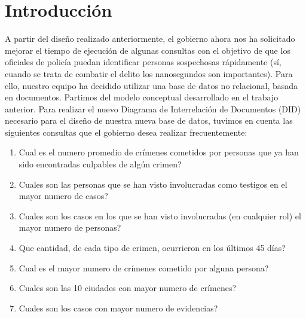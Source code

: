 \documentclass{article}
\theoremstyle{definition}
\theoremstyle{remark}
\begin{document}
{} %

\grupo{}

 
\maketitle

\tableofcontents

\pagebreak

\section{Introducción}

A partir del diseño realizado anteriormente, el gobierno ahora nos ha solicitado mejorar el tiempo de ejecución de algunas consultas con el objetivo de que los oficiales de policía puedan identificar personas sospechosas rápidamente (sí, cuando se trata de combatir el delito los nanosegundos son importantes). Para ello, nuestro equipo ha decidido utilizar una base de datos no relacional, basada en documentos. Partimos del modelo conceptual desarrollado en el trabajo anterior. Para realizar el nuevo Diagrama de Interrelación de Documentos (DID) necesario para el diseño de nuestra nueva base de datos, tuvimos en cuenta las siguientes consultas que el gobierno desea realizar frecuentemente:

\begin{enumerate}
    \item Cual es el numero promedio de crímenes cometidos por personas que ya han sido encontradas culpables de algún crimen?
    \item Cuales son las personas que se han visto involucradas como testigos en el mayor numero de casos?
    \item Cuales son los casos en los que se han visto involucradas (en cualquier rol) el mayor numero de personas?
    \item Que cantidad, de cada tipo de crimen, ocurrieron en los últimos 45 días?
    \item Cual es el mayor numero de crímenes cometido por alguna persona?
    \item Cuales son las 10 ciudades con mayor numero de crímenes?
    \item Cuales son los casos con mayor numero de evidencias?
\end{enumerate}
\end{document}
